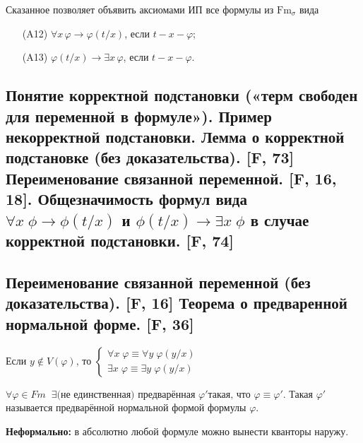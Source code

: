 \documentclass[a4paper, fleqn]{article}
\begin{document}
    Сказанное позволяет объявить аксиомами ИП все формулы из $\text{Fm}_{\sigma}$ вида\\[-25 pt]
    \begin{enumerate}
    \item[(A12)] $\forall x\, \varphi \to \varphi(t/x)$, если $t-x-\varphi$;
    \item[(A13)] $\varphi(t/x) \to \exists x\, \varphi$, если $t-x-\varphi$.
    \end{enumerate}

    \subsection{Понятие корректной подстановки («терм свободен для переменной в формуле»). Пример некорректной подстановки. Лемма о корректной подстановке (без доказательства). [F, 73] Переименование связанной переменной. [F, 16, 18]. Общезначимость формул вида $\forall x \; \phi \to \phi(t/x)$ и $\phi(t/x) \to \exists x \; \phi$ в случае корректной подстановки. [F, 74]}

    \subsection{Переименование связанной переменной (без доказательства). [F, 16] Теорема о предваренной нормальной форме. [F, 36]}
    \begin{proposition}

        Если $y \notin V(\varphi)$, то $\begin{cases}
        \forall x \; \varphi \equiv \forall y \; \varphi(y/x) \\
        \exists x \; \varphi \equiv \exists y \; \varphi(y/x)
        \end{cases}$
    \end{proposition}

    \begin{theorem}
        $\forall \varphi \in Fm \;\; \exists \text{(не единственная) предварённая } \varphi' \text{такая, что } \varphi \equiv \varphi'$. Такая $\varphi'$ называется предварённой нормальной формой формулы $\varphi$.
    \end{theorem}

    \textbf{Неформально:} в абсолютно любой формуле можно вынести кванторы наружу.
\end{document}
